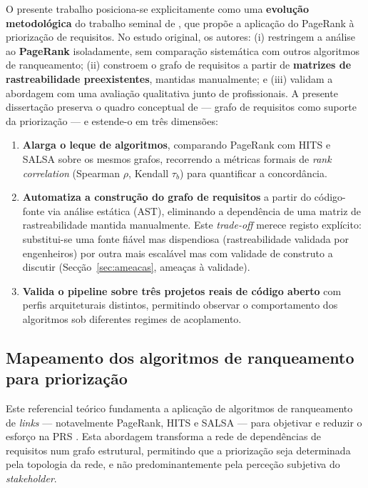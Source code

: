 O presente trabalho posiciona-se explicitamente como uma
\textbf{evolução metodológica} do trabalho seminal de
\citet{silva2018}, que propõe a aplicação do PageRank à priorização
de requisitos. No estudo original, os autores: (i) restringem a
análise ao \textbf{PageRank} isoladamente, sem comparação sistemática
com outros algoritmos de ranqueamento; (ii) constroem o grafo de
requisitos a partir de \textbf{matrizes de rastreabilidade
preexistentes}, mantidas manualmente; e (iii) validam a abordagem com
uma avaliação qualitativa junto de profissionais. A presente
dissertação preserva o quadro conceptual de \citet{silva2018} ---
grafo de requisitos como suporte da priorização --- e estende-o em
três dimensões:

\begin{enumerate}
    \item \textbf{Alarga o leque de algoritmos}, comparando PageRank
        com HITS \parencite{kleinberg1999} e SALSA
        \parencite{lempel2001} sobre os mesmos grafos, recorrendo a
        métricas formais de \emph{rank correlation} (Spearman $\rho$,
        Kendall $\tau_b$) para quantificar a concordância.
    \item \textbf{Automatiza a construção do grafo de requisitos} a
        partir do código-fonte via análise estática (AST), eliminando
        a dependência de uma matriz de rastreabilidade mantida
        manualmente. Este \emph{trade-off} merece registo explícito:
        substitui-se uma fonte fiável mas dispendiosa (rastreabilidade
        validada por engenheiros) por outra mais escalável mas com
        validade de construto a discutir
        (Secção~\ref{sec:ameacas}, ameaças à validade).
    \item \textbf{Valida o pipeline sobre três projetos reais de
        código aberto} com perfis arquiteturais distintos, permitindo
        observar o comportamento dos algoritmos sob diferentes
        regimes de acoplamento.
\end{enumerate}

\subsection{Mapeamento dos algoritmos de ranqueamento para
priorização}
\label{sec:mapeamento}

Este referencial teórico fundamenta a aplicação de algoritmos de
ranqueamento de \emph{links} --- notavelmente PageRank, HITS e
SALSA --- para objetivar e reduzir o esforço na PRS
\parencite{silva2018, ding2002}. Esta abordagem transforma a rede de
dependências de requisitos num grafo estrutural, permitindo que a
priorização seja determinada pela topologia da rede, e não
predominantemente pela perceção subjetiva do \emph{stakeholder}.

